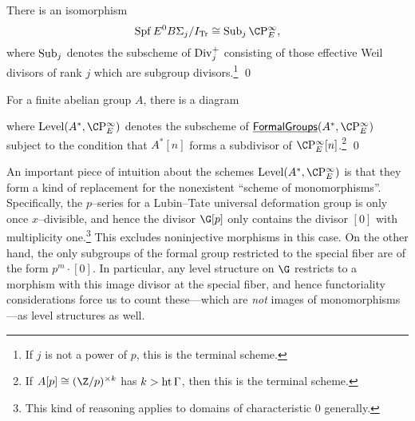 \begin{theorem}
There is an isomorphism \[\Spf E^0 B\Sigma_j / I_{\Tr} \cong \Sub_j \CP^\infty_E,\] where $\operatorname{Sub}_j$ denotes the subscheme of $\operatorname{Div}_j^+$ consisting of those effective Weil divisors of rank $j$ which are subgroup divisors.\footnote{If $j$ is not a power of $p$, this is the terminal scheme.} \qed
\end{theorem}

\begin{theorem}
For a finite abelian group $A$, there is a diagram
\begin{center}
\end{center}
where $\Level(A^*, \CP^\infty_E)$ denotes the subscheme of $\InternalHom{FormalGroups}(A^*, \CP^\infty_E)$ subject to the condition that $A^*[n]$ forms a subdivisor of $\CP^\infty_E[n]$.\footnote{If $A[p] \cong (\Z/p)^{\times k}$ has $k > \operatorname{ht}{\Gamma}$, then this is the terminal scheme.} \qed
\end{theorem}

\begin{remark}
An important piece of intuition about the schemes $\Level(A^*, \CP^\infty_E)$ is that they form a kind of replacement for the nonexistent ``scheme of monomorphisms''.  Specifically, the $p$--series for a Lubin--Tate universal deformation group is only once $x$--divisible, and hence the divisor $\G[p]$ only contains the divisor $[0]$ with multiplicity one.\footnote{This kind of reasoning applies to domains of characteristic $0$ generally.}  This excludes noninjective morphisms in this case.  On the other hand, the only subgroups of the formal group restricted to the special fiber are of the form $p^m \cdot [0]$.  In particular, any level structure on $\G$ restricts to a morphism with this image divisor at the special fiber, and hence functoriality considerations force us to count these---which are \emph{not} images of monomorphisms---as level structures as well.
\end{remark}


